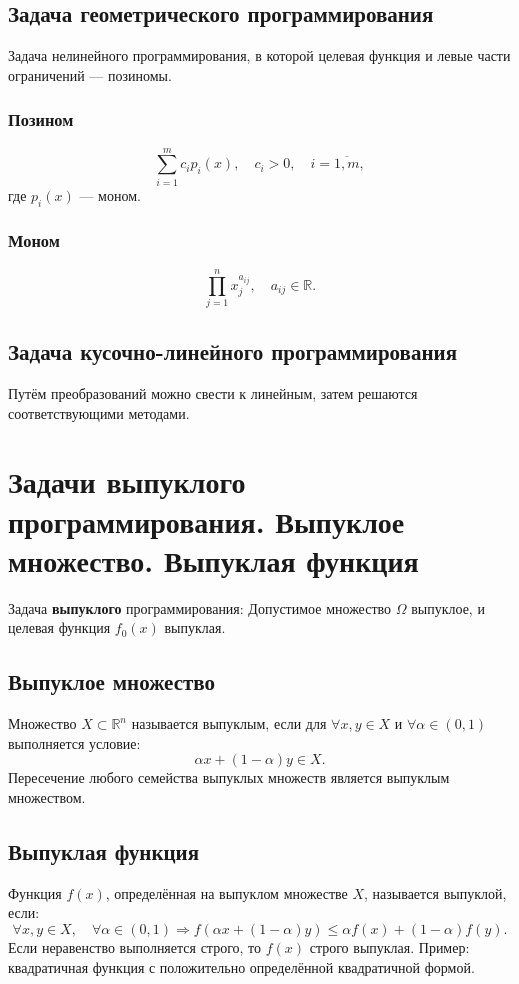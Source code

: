 \documentclass[17pt]{extarticle}
\begin{document}
\subsection{Задача геометрического программирования}
Задача нелинейного программирования, в которой целевая функция и левые части ограничений — позиномы.

\subsubsection{Позином}
\[
    \sum\limits_{i=1}^{m} c_i p_i(x), \quad c_i > 0, \quad i = \overline{1,m},
\]
где \( p_i(x) \) — моном.

\subsubsection{Моном}
\[
    \prod\limits_{j=1}^{n} x_j^{a_{ij}}, \quad a_{ij} \in \mathbb{R}.
\]

\subsection{Задача кусочно-линейного программирования}
Путём преобразований можно свести к линейным, затем решаются соответствующими методами.




\section{Задачи выпуклого программирования. Выпуклое множество. Выпуклая функция}

Задача \textbf{выпуклого} программирования:
Допустимое множество \( \Omega \) выпуклое, и целевая функция \( f_0(x) \) выпуклая.

\subsection{Выпуклое множество}
Множество \( X \subset \mathbb{R}^n \) называется выпуклым, если для \( \forall x, y \in X \) и \( \forall \alpha \in (0,1) \) выполняется условие:
\[
    \alpha x + (1 - \alpha) y \in X.
\]
Пересечение любого семейства выпуклых множеств является выпуклым множеством.

\subsection{Выпуклая функция}
Функция \( f(x) \), определённая на выпуклом множестве \( X \), называется выпуклой, если:
\[
    \forall x, y \in X, \quad \forall \alpha \in (0,1) \Rightarrow f(\alpha x + (1 - \alpha) y) \le \alpha f(x) + (1 - \alpha) f(y).
\]
Если неравенство выполняется строго, то \( f(x) \) строго выпуклая. Пример: квадратичная функция с положительно определённой квадратичной формой.
\end{document}
